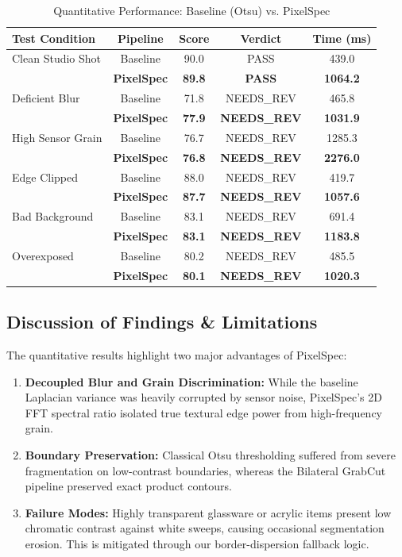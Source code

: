 \documentclass[conference]{IEEEtran}
\begin{document}
\begin{table}[htbp]
\caption{Quantitative Performance: Baseline (Otsu) vs. PixelSpec}
\begin{center}
\begin{tabular}{lcccc}
\toprule
\textbf{Test Condition} & \textbf{Pipeline} & \textbf{Score} & \textbf{Verdict} & \textbf{Time (ms)} \\
\midrule
Clean Studio Shot & Baseline & 90.0 & PASS & 439.0 \\
                  & \textbf{PixelSpec} & \textbf{89.8} & \textbf{PASS} & \textbf{1064.2} \\
\midrule
Deficient Blur & Baseline & 71.8 & NEEDS\_REV & 465.8 \\
               & \textbf{PixelSpec} & \textbf{77.9} & \textbf{NEEDS\_REV} & \textbf{1031.9} \\
\midrule
High Sensor Grain & Baseline & 76.7 & NEEDS\_REV & 1285.3 \\
                  & \textbf{PixelSpec} & \textbf{76.8} & \textbf{NEEDS\_REV} & \textbf{2276.0} \\
\midrule
Edge Clipped & Baseline & 88.0 & NEEDS\_REV & 419.7 \\
             & \textbf{PixelSpec} & \textbf{87.7} & \textbf{NEEDS\_REV} & \textbf{1057.6} \\
\midrule
Bad Background & Baseline & 83.1 & NEEDS\_REV & 691.4 \\
               & \textbf{PixelSpec} & \textbf{83.1} & \textbf{NEEDS\_REV} & \textbf{1183.8} \\
\midrule
Overexposed & Baseline & 80.2 & NEEDS\_REV & 485.5 \\
            & \textbf{PixelSpec} & \textbf{80.1} & \textbf{NEEDS\_REV} & \textbf{1020.3} \\
\bottomrule
\end{tabular}
\end{center}
\end{table}

\subsection{Discussion of Findings & Limitations}
The quantitative results highlight two major advantages of PixelSpec:
\begin{enumerate}
    \item \textbf{Decoupled Blur and Grain Discrimination:} While the baseline Laplacian variance was heavily corrupted by sensor noise, PixelSpec's 2D FFT spectral ratio isolated true textural edge power from high-frequency grain.
    \item \textbf{Boundary Preservation:} Classical Otsu thresholding suffered from severe fragmentation on low-contrast boundaries, whereas the Bilateral GrabCut pipeline preserved exact product contours.
    \item \textbf{Failure Modes:} Highly transparent glassware or acrylic items present low chromatic contrast against white sweeps, causing occasional segmentation erosion. This is mitigated through our border-dispersion fallback logic.
\end{enumerate}
\end{document}
